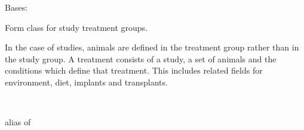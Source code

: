 \documentclass[letterpaper,10pt,english]{sphinxmanual}
\begin{document}
\begin{fulllineitems}
\label{api:mousedb.data.forms.TreatmentForm}
Bases: 

Form class for study treatment groups.

In the case of studies, animals are defined in the treatment group rather than in the study group.  A treatment consists of a study, a set of animals and the conditions which define that treatment.  This includes related fields for environment, diet, implants and transplants.


\begin{fulllineitems}
\label{api:mousedb.data.forms.TreatmentForm.Media}
\end{fulllineitems}



\begin{fulllineitems}
\label{api:mousedb.data.forms.TreatmentForm.Meta}~

\begin{fulllineitems}
\label{api:mousedb.data.forms.TreatmentForm.Meta.model}
alias of 

\end{fulllineitems}


\end{fulllineitems}



\begin{fulllineitems}
\label{api:mousedb.data.forms.TreatmentForm.media}
\end{fulllineitems}


\end{fulllineitems}
\end{document}
